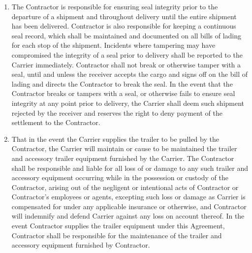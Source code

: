 \begin{enumerate}[
    ref = \SecondLevelEnumerator
]
    \item The Contractor is responsible for ensuring seal integrity prior
    to the departure of a shipment and throughout delivery until the entire
    shipment has been delivered. Contractor is also responsible for keeping
    a continuous seal record, which shall be maintained and documented on
    all bills of lading for each stop of the shipment. Incidents where
    tampering may have compromised the integrity of a seal prior to
    delivery shall be reported to the Carrier immediately. Contractor shall
    not break or otherwise tamper with a seal, until and unless the
    receiver accepts the cargo and signs off on the bill of lading and
    directs the Contractor to break the seal. In the event that the
    Contractor breaks or tampers with a seal, or otherwise fails to ensure
    seal integrity at any point prior to delivery, the Carrier shall deem
    such shipment rejected by the receiver and reserves the right to deny
    payment of the settlement to the Contractor.

    \item That in the event the Carrier supplies the trailer to be pulled
    by the Contractor, the Carrier will maintain or cause to be maintained
    the trailer and accessory trailer equipment furnished by the Carrier.
    The Contractor shall be responsible and liable for all loss of or
    damage to any such trailer and accessory equipment occurring while in
    the possession or custody of the Contractor, arising out of the
    negligent or intentional acts of Contractor or Contractor's employees
    or agents, excepting such loss or damage as Carrier is compensated for
    under any applicable insurance or otherwise, and Contractor will
    indemnify and defend Carrier against any loss on account thereof. In
    the event Contractor supplies the trailer equipment under this
    Agreement, Contractor shall be responsible for the maintenance of the
    trailer and accessory equipment furnished by Contractor.
\end{enumerate}